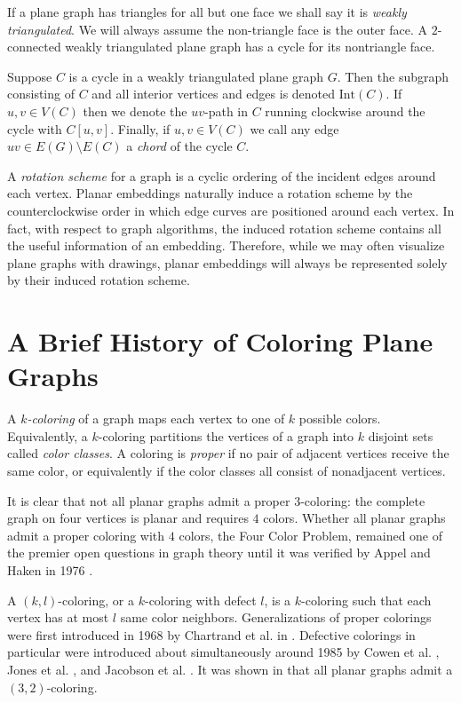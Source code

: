 \documentclass[letterpaper, 12pt]{article}
\theoremstyle{definition}
\theoremstyle{definition}
\theoremstyle{thm}
\theoremstyle{definition}
\begin{document}
If a plane graph has triangles for all but one face we shall say it is
\textit{weakly triangulated}. We will always assume the non-triangle face is the
outer face. A $2$-connected weakly triangulated plane graph has a cycle for its
nontriangle face.

Suppose $C$ is a cycle in a weakly
triangulated plane graph $G$. Then the subgraph consisting of $C$ and all interior
vertices and edges is denoted $\text{Int}(C)$. If $u,v \in V(C)$ then we denote
the $uv$-path in $C$ running clockwise around the cycle with $C[u,v]$. Finally,
if $u,v\in V(C)$ we call any edge $uv \in E(G)\setminus E(C)$ a \textit{chord} of
the cycle $C$.

A \textit{rotation scheme} for a graph is a cyclic ordering of the incident
edges around each vertex. Planar embeddings naturally induce a rotation
scheme by the counterclockwise order in which edge curves are positioned around
each vertex. In fact, with respect to graph algorithms, the induced rotation
scheme contains all the useful information of an embedding. Therefore, while we
may often visualize plane graphs with drawings, planar embeddings will always be
represented solely by their induced rotation scheme.

\section{A Brief History of Coloring Plane Graphs}

A $k$\textit{-coloring} of a graph maps each vertex to one of $k$ possible
colors. Equivalently, a $k$-coloring partitions the vertices of a graph into $k$
disjoint sets called \textit{color classes}. 
A coloring is \textit{proper} if no pair of adjacent vertices receive the same
color, or equivalently if the color classes all consist of nonadjacent vertices.

It is clear that not all planar graphs admit a proper $3$-coloring: the
complete graph on four vertices is planar and requires $4$ colors. Whether all
planar graphs admit a proper coloring with $4$ colors, the Four Color Problem,
remained one of the premier open questions in graph theory until it was verified
by Appel and Haken in 1976 \cite{appel1, appel2}.

A $(k,l)$-coloring, or a $k$-coloring with defect $l$, is a
$k$-coloring such that each vertex has at most $l$ same color neighbors.
Generalizations of proper colorings were first introduced in 1968 by Chartrand et al. in
\cite{chartrand}. Defective colorings in particular were introduced about
simultaneously around 1985 by Cowen et al. \cite{cowen}, Jones et al. \cite{jones}, and
Jacobson et al. \cite{jacobson}. It was shown in \cite{cowen} that all
planar graphs admit a $(3,2)$-coloring.
\end{document}
